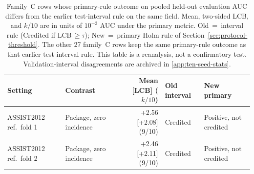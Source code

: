 \begin{table}[tbp]
\caption{Family~C rows whose primary-rule outcome on pooled held-out
evaluation AUC differs from the earlier test-interval rule on the
same field. Mean, two-sided LCB, and $k/10$ are in units of
$10^{-3}$ AUC under the primary metric. Old~=~interval rule
(Credited if LCB$\,\ge\tau$); New~=~primary Holm rule of
Section~\ref{sec:protocol-threshold}. The other 27 family~C rows keep the same primary-rule outcome as that
earlier test-interval rule. This table is a reanalysis, not a
confirmatory test. Validation-interval disagreements are archived
in \ref{app:ten-seed-stats}.}
\label{tab:credit-primary-changes}
\centering
\scriptsize
\setlength{\tabcolsep}{3pt}
\begin{tabular}{@{}llrll@{}}
\toprule
Setting & Contrast & Mean [LCB] ($k/10$) & Old interval & New primary \\
\midrule
ASSIST2012 ref.\ fold 1 & Package, zero incidence & +2.56 [+2.08] (9/10) & Credited & Positive, not credited \\
ASSIST2012 ref.\ fold 2 & Package, zero incidence & +2.46 [+2.11] (9/10) & Credited & Positive, not credited \\
\bottomrule
\end{tabular}
\end{table}
